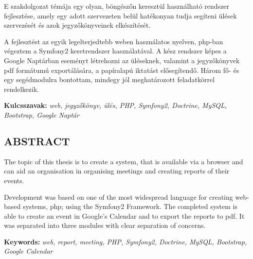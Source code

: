 \documentclass[a4paper,12pt,oneside]{report}
\begin{document}
E szakdolgozat témája egy olyan, böngészőn keresztül használható rendszer fejlesztése, amely egy adott szervezeten belül hatékonyan tudja segíteni ülések szervezését és azok jegyzőkönyveinek elkészítését.

A fejlesztést az egyik legelterjedtebb weben használatos nyelven, php-ban végeztem a Symfony2 keretrendszer használatával. A kész rendszer képes a Google Naptárban eseményt létrehozni az üléseknek, valamint a jegyzőkönyvek pdf formátumú exportálására, a papíralapú iktatást elősegítendő. Három fő- és egy segédmodulra bontottam, mindegy jól meghatározott feladatkörrel rendelkezik.

\vspace{2cm}

{\bf Kulcsszavak:} {\it web, jegyzőkönyv, ülés, PHP, Symfony2, Doctrine, MySQL, Bootstrap, Google Naptár}
\newpage

\newpage

\begin{center}
\section*{\textbf{\Large \MakeUppercase{Abstract}}}
\end{center}

The topic of this thesis is to create a system, that is available via a browser and can aid an organisation in organising meetings and creating reports of their events.

Development was based on one of the most widespread language for creating web-based systems, php; using the Symfony2 Framework. The completed system is able to create an event in Google's Calendar and to export the reports to pdf. It was separated into three modules with clear separation of concerns.

\vspace{2cm}

{\bf Keywords:} {\it web, report, meeting, PHP, Symfony2, Doctrine, MySQL, Bootstrap, Google Calendar}
\newpage

\renewcommand{\thefigure}{\arabic{figure}}

\setcounter{tocdepth}{3} %
\thispagestyle{empty}
\tableofcontents
\pagebreak

\setcounter{page}{1} %
\pagestyle{plain}
\fancyhead[C]{\rightmark}
\fancyfoot[R]{\thepage}
\end{document}
